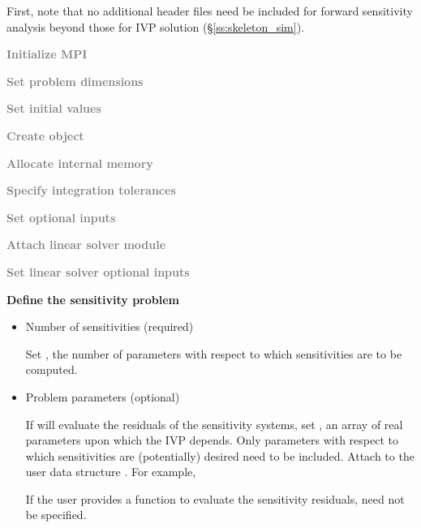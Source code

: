 First, note that no additional header files need be included for forward sensitivity 
analysis beyond those for IVP solution (\S\ref{ss:skeleton_sim}).
\begin{Steps}
  
\item 
  \textcolor{gray}{\bf {\p} Initialize MPI}

\item
  \textcolor{gray}{\bf Set problem dimensions}

\item
  \textcolor{gray}{\bf Set initial values}
 
\item
  \textcolor{gray}{\bf Create {\idas} object}

\item
  \textcolor{gray}{\bf Allocate internal memory}

\item
  \textcolor{gray}{\bf Specify integration tolerances}

\item
  \textcolor{gray}{\bf Set optional inputs}

\item
  \textcolor{gray}{\bf Attach linear solver module}

\item
  \textcolor{gray}{\bf Set linear solver optional inputs}

\item \label{i:fwd_start}
  {\bf Define the sensitivity problem}

  \begin{itemize}

    \item Number of sensitivities (required)

      Set , the number of parameters with respect to which sensitivities
      are to be computed.
  
    \item Problem parameters (optional)

      If {\idas} will evaluate the residuals of the sensitivity 
      systems, set , an array of  real parameters upon which the IVP 
      depends. Only parameters with respect to which sensitivities are (potentially) 
      desired need to be included. 
      Attach  to the user data structure . 
      For example, 

      If the user provides a function to evaluate the sensitivity residuals,
       need not be specified.


\end{itemize}
\end{Steps}
